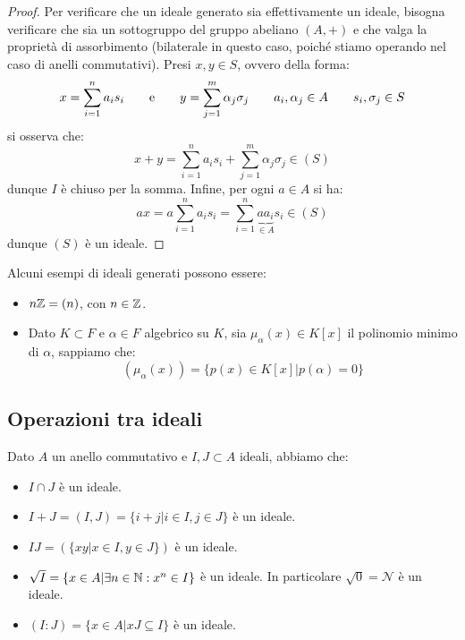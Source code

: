\documentclass[11pt]{scrartcl}
\begin{document}
\begin{proof}
    Per verificare che un ideale generato sia effettivamente un ideale, bisogna verificare che sia un sottogruppo del gruppo abeliano $(A,+)$ e che valga la proprietà di assorbimento (bilaterale in questo caso,
    poiché stiamo operando nel caso di anelli commutativi). Presi $x,y \in S$, ovvero della forma:
        \[ x = \sum_{i = 1}^n a_is_i \qquad \text e \qquad y = \sum_{j=1}^m\alpha_j \sigma_j \qquad a_i,\alpha_j \in A \qquad s_i,\sigma_j \in S 
            \]
    si osserva che:
        \[ x + y = \sum_{i = 1}^n a_is_i + \sum_{j=1}^m\alpha_j \sigma_j \in (S)
            \]
    dunque $I$ è chiuso per la somma. Infine, per ogni $a \in A$ si ha:
        \[ ax = a\sum_{i = 1}^n a_is_i = \sum_{i = 1}^n \underbrace{aa_i}_{\in A}s_i \in (S)
            \]
    dunque $(S)$ è un ideale.
\end{proof}

\begin{example}
    Alcuni esempi di ideali generati possono essere:
    \begin{itemize}
        \item $n\mathbb Z = (n)$, con $n \in \mathbb Z$.
        \item Dato $K \subset F$ e $\alpha \in F$ algebrico su $K$, sia $\mu_{\alpha}(x) \in K[x]$ il polinomio minimo di $\alpha$, sappiamo che:
            \[ (\mu_{\alpha}(x)) = \{p(x) \in K[x] | p(\alpha) = 0\}
                \]
    \end{itemize}
\end{example}


\newpage
\subsection{Operazioni tra ideali}
\begin{proposition}
    Dato $A$ un anello commutativo e $I,J \subset A$ ideali, abbiamo che:
    \begin{itemize}
        \item $I \cap J$ è un ideale.
        \item $I + J = (I,J) = \{i + j | i \in I, j \in J\}$ è un ideale.
        \item $IJ = (\{xy|x \in I, y \in J\})$ è un ideale.
        \item $\sqrt{I} = \{x \in A | \exists n \in \mathbb N : x^n \in I\}$ è un ideale. In particolare $\sqrt{0} = \mathcal{N}$ è un ideale.
        \item $(I : J) = \{x \in A | xJ \subseteq I\}$ è un ideale.
    \end{itemize}
\end{proposition}
\end{document}
